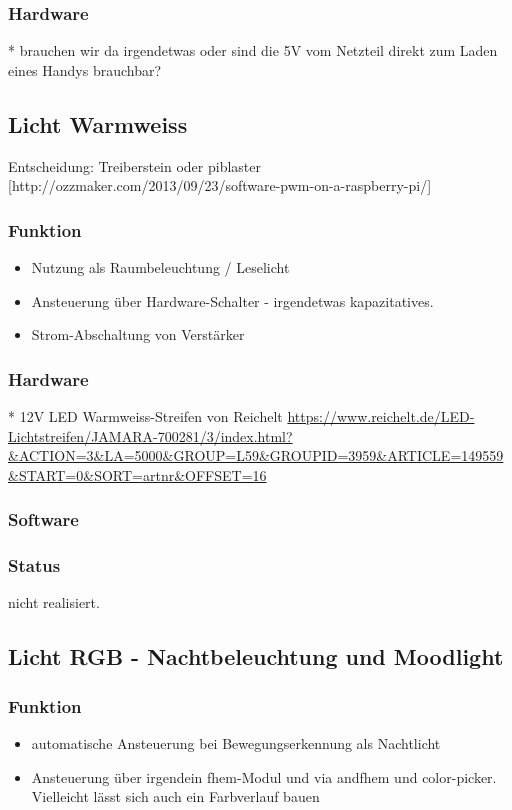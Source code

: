 \documentclass[a4paper,twoside,titlepage,normalheadings,tocleft,bibtotoc]{scrartcl}
\begin{document}
\subsubsection{Hardware}
* brauchen wir da irgendetwas oder sind die 5V vom Netzteil direkt zum Laden
eines Handys brauchbar?

\subsection{Licht Warmweiss}
Entscheidung: Treiberstein oder piblaster [http://ozzmaker.com/2013/09/23/software-pwm-on-a-raspberry-pi/]
\subsubsection{Funktion}
\begin{itemize}
\item Nutzung als Raumbeleuchtung / Leselicht
\item Ansteuerung über Hardware-Schalter - irgendetwas kapazitatives.
\item Strom-Abschaltung von Verstärker
\end{itemize}

\subsubsection{Hardware}
* 12V LED Warmweiss-Streifen von Reichelt \url{https://www.reichelt.de/LED-Lichtstreifen/JAMARA-700281/3/index.html?&ACTION=3&LA=5000&GROUP=L59&GROUPID=3959&ARTICLE=149559&START=0&SORT=artnr&OFFSET=16}

\subsubsection{Software}
\subsubsection{Status}
nicht realisiert.

\subsection{Licht RGB - Nachtbeleuchtung und Moodlight}

\subsubsection{Funktion}
\begin{itemize}
\item automatische Ansteuerung bei Bewegungserkennung als Nachtlicht
\item Ansteuerung über irgendein fhem-Modul und via andfhem und color-picker. Vielleicht lässt sich auch ein Farbverlauf bauen
\end{itemize}
\end{document}
